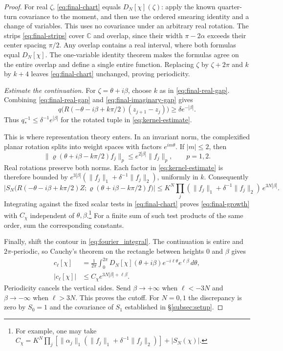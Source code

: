 \documentclass[11pt, letterpaper, reqno]{amsart}
\theoremstyle{definition}
\theoremstyle{remark}
\newcommand{\bbC}{\mathbb{C}}
\begin{document}
\begin{proof}
For real $\zeta$, \eqref{eq:final-chart} equals $D_N[\chi](\zeta)$:
apply the known quarter-turn covariance to the moment, and then use the
ordered smearing identity and a change of variables. This uses no
covariance under an arbitrary real rotation.
The strips \eqref{eq:final-strips} cover $\bbC$ and overlap, since
their width $\pi-2\alpha$ exceeds their center spacing $\pi/2$.
Any overlap contains a real interval, where both formulas equal
$D_N[\chi]$. The one-variable identity theorem makes the
formulas agree on the entire overlap and define a single entire
function. Replacing $\zeta$ by $\zeta+2\pi$ and $k$ by $k+4$ leaves
\eqref{eq:final-chart} unchanged, proving periodicity.

\emph{Estimate the continuation.}
For $\zeta=\theta+i\beta$, choose $k$ as in
\eqref{eq:final-real-gap}. Combining \eqref{eq:final-real-gap} and
\eqref{eq:final-imaginary-gap} gives
\[
 q\bigl(R(-\theta-i\beta+k\pi/2)(z_{j+1}-z_j)\bigr)
 \ge \delta e^{-|\beta|}.
\]
Thus $q_*^{-1}\leq\delta^{-1}e^{|\beta|}$ for the rotated tuple in
\eqref{eq:kernel-estimate}.

This is where representation theory enters. In an invariant norm, the
complexified planar rotation splits into weight spaces with factors
$e^{im\theta}$. If $|m|\le2$, then
\begin{equation}\label{eq:final-tensor}
 \|\varrho(\theta+i\beta-k\pi/2)f_j\|_p
 \le e^{2|\beta|}\|f_j\|_p,\qquad p=1,2.
\end{equation}
Real rotations preserve both norms. Each factor in
\eqref{eq:kernel-estimate} is therefore bounded by
$e^{3|\beta|}(\|f_j\|_1+\delta^{-1}\|f_j\|_2)$, uniformly in $k$.
Consequently
\begin{equation}\label{eq:final-rotated-kernel}
 \left|S_N\bigl(R(-\theta-i\beta+k\pi/2)Z;
                      \varrho(\theta+i\beta-k\pi/2)f\bigr)\right|
 \le K^N\prod_j(\|f_j\|_1+\delta^{-1}\|f_j\|_2)\,e^{3N|\beta|}.
\end{equation}
Integrating against the fixed scalar tests in \eqref{eq:final-chart}
proves \eqref{eq:final-growth} with $C_\chi$ independent of
$\theta,\beta$.\footnote{For example, one may take
$C_\chi=K^N\prod_j[\|\alpha_j\|_1(\|f_j\|_1+\delta^{-1}\|f_j\|_2)]+|S_N(\chi)|$.}
For a finite sum of such test products of the same order, sum the
corresponding constants.

Finally, shift the contour in \eqref{eq:fourier_integral}. The
continuation is entire and $2\pi$-periodic, so Cauchy's theorem on
the rectangle between heights $0$ and $\beta$ gives
\begin{equation}\label{eq:final-contour}
 \begin{split}
 c_\ell[\chi]
 &=\frac1{2\pi}\int_0^{2\pi}
 D_N[\chi](\theta+i\beta)e^{-i\ell\theta}e^{\ell\beta}\,d\theta,\\
 |c_\ell[\chi]|&\le C_\chi e^{3N|\beta|+\ell\beta}.
 \end{split}
\end{equation}
Periodicity cancels the vertical sides. Send $\beta\to+\infty$ when
$\ell<-3N$ and $\beta\to-\infty$ when $\ell>3N$. This proves the cutoff.
For $N=0,1$ the discrepancy is zero by $S_0=1$ and the covariance
of $S_1$ established in \S\ref{subsec:setup}.
\end{proof}
\end{document}
